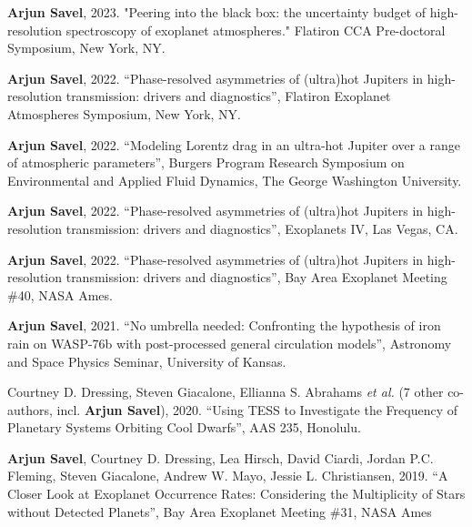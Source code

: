 \documentclass[letterpaper,10.5pt]{article}
\begin{document}
\small
  \begin{list}{}{\cvlist}
  

  \item[{\color{numcolor}\scriptsize10}] \textbf{Arjun Savel}, 2023. "Peering into the black box: 
the uncertainty budget of high-resolution spectroscopy of exoplanet atmospheres." Flatiron CCA Pre-doctoral Symposium, New York, NY.

\item[{\color{numcolor}\scriptsize9}] \textbf{Arjun Savel}, 2022. ``Phase-resolved asymmetries of (ultra)hot Jupiters in high-resolution transmission: drivers and diagnostics'', Flatiron Exoplanet Atmospheres Symposium, New York, NY.

  \item[{\color{numcolor}\scriptsize8}] \textbf{Arjun Savel}, 2022. ``Modeling Lorentz drag in an ultra-hot Jupiter over a range of atmospheric parameters'', Burgers Program Research Symposium on Environmental and Applied Fluid Dynamics, The George Washington University.

     \item[{\color{numcolor}\scriptsize7}] \textbf{Arjun Savel}, 2022. ``Phase-resolved asymmetries of (ultra)hot Jupiters in high-resolution transmission: drivers and diagnostics'', Exoplanets IV, Las Vegas, CA.


   \item[{\color{numcolor}\scriptsize6}] \textbf{Arjun Savel}, 2022. ``Phase-resolved asymmetries of (ultra)hot Jupiters in high-resolution transmission: drivers and diagnostics'', Bay Area Exoplanet Meeting \#40, NASA Ames.


\item[{\color{numcolor}\scriptsize5}] \textbf{Arjun Savel}, 2021. ``No umbrella needed: Confronting the hypothesis of iron rain on WASP-76b with post-processed general circulation models'', Astronomy and Space Physics Seminar, University of Kansas.


\item[{\color{numcolor}\scriptsize4}] Courtney D. Dressing, Steven Giacalone, Ellianna S. Abrahams \emph{et al.} (7 other co-authors, incl. \textbf{Arjun Savel}), 2020. ``Using TESS to Investigate the Frequency of Planetary Systems Orbiting Cool Dwarfs'', AAS 235, Honolulu.


\item[{\color{numcolor}\scriptsize3}] \textbf{Arjun Savel}, Courtney D. Dressing, Lea Hirsch, David Ciardi, Jordan P.C. Fleming, Steven Giacalone, Andrew W. Mayo, Jessie L. Christiansen, 2019. “A Closer Look at Exoplanet Occurrence Rates: Considering the Multiplicity of Stars without Detected Planets”, Bay Area Exoplanet Meeting \#31, NASA Ames


\end{list}
\end{document}

